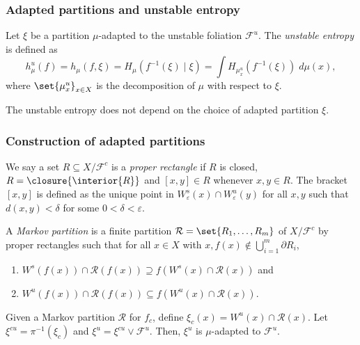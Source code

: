 \documentclass[shortlabels, 9pt, aspectratio=2013]{beamer}
\begin{document}
\begin{frame}
  \frametitle{Adapted partitions and unstable entropy}
  \begin{definition}
    Let \(\xi\) be a partition \(\mu\)-adapted to the unstable foliation \(\mathcal{F}^u\). The \emph{unstable entropy} is defined as
    \begin{equation*}
      h_{\mu}^u(f) =
      h_{\mu}(f, \xi) =
      H_{\mu}(f ^{-1}(\xi) \mid \xi) =
      \int H_{\mu_x^u}(f^{-1}(\xi))\;d\mu(x),
    \end{equation*}
    where \(\set{\mu^u_x}_{x \in X}\) is the decomposition of \(\mu\) with respect to \(\xi\).
  \end{definition}
  \begin{lemma}
    The unstable entropy does not depend on the choice of adapted partition \(\xi\).
  \end{lemma}
\end{frame}

\begin{frame}
  \frametitle{Construction of adapted partitions}
  \begin{definition}
    We say a set \(R \subseteq X/\mathcal{F}^c\) is a \emph{proper rectangle} if \(R\) is closed, \(R = \closure{\interior{R}}\) and \([x,y] \in R\) whenever \(x, y \in R\). The bracket \([x,y]\) is defined as the unique point in \(W^s_{\varepsilon}(x)\cap W^u_{\varepsilon}(y)\) for all \(x,y\) such that \(d(x,y) < \delta\) for some \(0 < \delta < \varepsilon\).
  \end{definition}

  \begin{definition}
    A \emph{Markov partition} is a finite partition \(\mathcal{R} = \set{R_1,\dots,R_m}\) of \(X/\mathcal{F}^c\) by proper rectangles such that for all \(x \in X\) with \(x, f(x) \notin \bigcup_{i = 1}^m \partial R_i\),
    \begin{enumerate}
    \item \(W^s(f(x)) \cap \mathcal{R}(f(x)) \supseteq f(W^s(x)\cap \mathcal{R}(x))\) and
    \item \(W^u(f(x)) \cap \mathcal{R}(f(x)) \subseteq f(W^u(x)\cap \mathcal{R}(x))\).
    \end{enumerate}
  \end{definition}
  \begin{lemma}
    Given a Markov partition \(\mathcal{R}\) for \(f_c\), define \(\xi_c(x) = W^u(x) \cap \mathcal{R}(x)\). Let \(\xi^{cu} = \pi^{-1}(\xi_c)\) and \(\xi^u = \xi^{cu} \vee \mathcal{F}^u\). Then, \(\xi^u\) is \(\mu\)-adapted to \(\mathcal{F}^u\).
  \end{lemma}
\end{frame}
\end{document}

